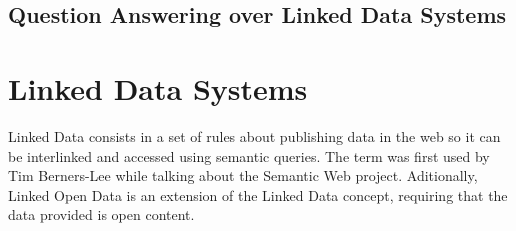 \subsection{Question Answering over Linked Data Systems}
\label{subsec:qa_linked}



\section{Linked Data Systems}
\label{sec:linkd_sys}

Linked Data consists in a set of rules about publishing data in the web so it can be interlinked and accessed using semantic queries. The term was first used by Tim Berners-Lee while talking about the Semantic Web project. Aditionally, Linked Open Data is an extension of the Linked Data concept, requiring that the data provided is open content.
